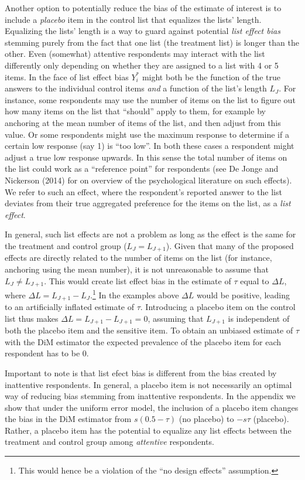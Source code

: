 \documentclass[]{article}
\let\rmarkdownfootnote\footnote%
\def\footnote{\protect\rmarkdownfootnote}
\begin{document}
Another option to potentially reduce the bias of the estimate of
interest is to include a \emph{placebo} item in the control list that
equalizes the lists' length. Equalizing the lists' length is a way to
guard against potential \emph{list effect bias} stemming purely from the
fact that one list (the treatment list) is longer than the other. Even
(somewhat) attentive respondents may interact with the list differently
only depending on whether they are assigned to a list with 4 or 5 items.
In the face of list effect bias \(Y^*_{i}\) might both be the function
of the true answers to the individual control items \emph{and} a
function of the list's length \(L_{J}\). For instance, some respondents
may use the number of items on the list to figure out how many items on
the list that ``should'' apply to them, for example by anchoring at the
mean number of items of the list, and then adjust from this value. Or
some respondents might use the maximum response to determine if a
certain low response (say 1) is ``too low''. In both these cases a
respondent might adjust a true low response upwards. In this sense the
total number of items on the list could work as a ``reference point''
for respondents (see De Jonge and Nickerson (2014) for on overview of
the psychological literature on such effects). We refer to such an
effect, where the respondent's reported answer to the list deviates from
their true aggregated preference for the items on the list, as a
\emph{list effect}.

In general, such list effects are not a problem as long as the effect is
the same for the treatment and control group (\(L_{J}=L_{J+1}\)). Given
that many of the proposed effects are directly related to the number of
items on the list (for instance, anchoring using the mean number), it is
not unreasonable to assume that \(L_{J} \neq L_{J+1}\). This would
create list effect bias in the estimate of \(\tau\) equal to
\(\Delta L\), where \(\Delta L = L_{J+1} - L_{J}\).\footnote{This would
  hence be a violation of the ``no design effects'' assumption.} In the
examples above \(\Delta L\) would be positive, leading to an
artificially inflated estimate of \(\tau\). Introducing a placebo item
on the control list thus makes \(\Delta L = L_{J+1} - L_{J+1} = 0\),
assuming that \(L_{J+1}\) is independent of both the placebo item and
the sensitive item. To obtain an unbiased estimate of \(\tau\) with the
DiM estimator the expected prevalence of the placebo item for each
respondent has to be 0.

Important to note is that list efect bias is different from the bias
created by inattentive respondents. In general, a placebo item is not
necessarily an optimal way of reducing bias stemming from inattentive
respondents. In the appendix we show that under the uniform error model,
the inclusion of a placebo item changes the bias in the DiM estimator
from \(s \left(0.5 - \tau \right)\) (no placebo) to \(-s\tau\)
(placebo). Rather, a placebo item has the potential to equalize any list
effects between the treatment and control group among \emph{attentive}
respondents.
\end{document}
